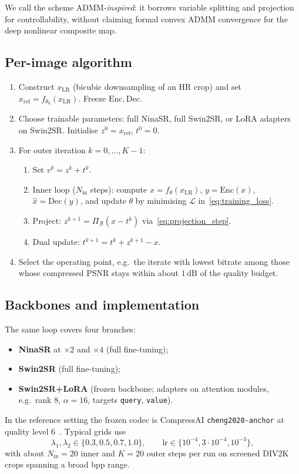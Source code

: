We call the scheme ADMM-\emph{inspired}: it borrows variable splitting and
projection for controllability, without claiming formal convex ADMM convergence
for the deep nonlinear composite map.

\subsection{Per-image algorithm}

\begin{enumerate}
    \item Construct \(x_{\mathrm{LR}}\) (bicubic downsampling of an HR crop) and
    set \(x_{\mathrm{ref}}=f_{\theta_0}(x_{\mathrm{LR}})\). Freeze
    \(\mathrm{Enc},\mathrm{Dec}\).
    \item Choose trainable parameters: full NinaSR, full Swin2SR, or LoRA
    adapters on Swin2SR. Initialise \(z^{0}=x_{\mathrm{ref}}\), \(t^{0}=0\).
    \item For outer iteration \(k=0,\ldots,K-1\):
    \begin{enumerate}
        \item Set \(v^{k}=z^{k}+t^{k}\).
        \item Inner loop (\(N_{\mathrm{in}}\) steps): compute
        \(x=f_{\theta}(x_{\mathrm{LR}})\), \(y=\mathrm{Enc}(x)\),
        \(\hat{x}=\mathrm{Dec}(y)\), and update \(\theta\) by minimising
        \(\mathcal{L}\) in~\eqref{eq:training_loss}.
        \item Project: \(z^{k+1}=\Pi_{\mathcal{B}}(x-t^{k})\)
        via~\eqref{eq:projection_step}.
        \item Dual update: \(t^{k+1}=t^{k}+z^{k+1}-x\).
    \end{enumerate}
    \item Select the operating point, e.g.\ the iterate with lowest bitrate
    among those whose compressed PSNR stays within about \(1\,\mathrm{dB}\) of
    the quality budget.
\end{enumerate}

\subsection{Backbones and implementation}

The same loop covers four branches:
\begin{itemize}
    \item \textbf{NinaSR} at \(\times 2\) and \(\times 4\) (full fine-tuning);
    \item \textbf{Swin2SR} (full fine-tuning);
    \item \textbf{Swin2SR+LoRA} (frozen backbone; adapters on attention modules,
    e.g.\ rank \(8\), \(\alpha=16\), targets \texttt{query}, \texttt{value}).
\end{itemize}

In the reference setting the frozen codec is CompressAI
\texttt{cheng2020-anchor} at quality level \(6\)~\cite{cheng2020learned,begaint2020compressai}.
Typical grids use
\[
\lambda_1, \lambda_2 \in \{0.3, 0.5, 0.7, 1.0\}, \qquad
\mathrm{lr} \in \{10^{-4}, 3\cdot 10^{-4}, 10^{-3}\},
\]
with about \(N_{\mathrm{in}}=20\) inner and \(K=20\) outer steps per run on
screened DIV2K crops spanning a broad bpp range.
